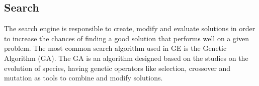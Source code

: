 \documentclass[12pt]{article}
\begin{document}
\subsection{Search}


The search engine is responsible to create, modify and evaluate solutions in order to increase the chances of finding a good solution that performs well on a given problem. The most common search algorithm used in GE is the Genetic Algorithm (GA). The GA is an algorithm designed based on the studies on the evolution of species, having genetic operators like selection, crossover and mutation as tools to combine and modify solutions.




\end{document}
